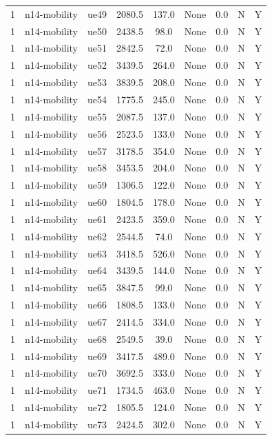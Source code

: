 \begin{table}[ht]
\begin{tabular}{|c|c|c|c|c|c|c|c|c|}
1 & n14-mobility & ue49 & 2080.5 & 137.0 & None & 0.0 & N & Y \\
1 & n14-mobility & ue50 & 2438.5 & 98.0 & None & 0.0 & N & Y \\
1 & n14-mobility & ue51 & 2842.5 & 72.0 & None & 0.0 & N & Y \\
1 & n14-mobility & ue52 & 3439.5 & 264.0 & None & 0.0 & N & Y \\
1 & n14-mobility & ue53 & 3839.5 & 208.0 & None & 0.0 & N & Y \\
1 & n14-mobility & ue54 & 1775.5 & 245.0 & None & 0.0 & N & Y \\
1 & n14-mobility & ue55 & 2087.5 & 137.0 & None & 0.0 & N & Y \\
1 & n14-mobility & ue56 & 2523.5 & 133.0 & None & 0.0 & N & Y \\
1 & n14-mobility & ue57 & 3178.5 & 354.0 & None & 0.0 & N & Y \\
1 & n14-mobility & ue58 & 3453.5 & 204.0 & None & 0.0 & N & Y \\
1 & n14-mobility & ue59 & 1306.5 & 122.0 & None & 0.0 & N & Y \\
1 & n14-mobility & ue60 & 1804.5 & 178.0 & None & 0.0 & N & Y \\
1 & n14-mobility & ue61 & 2423.5 & 359.0 & None & 0.0 & N & Y \\
1 & n14-mobility & ue62 & 2544.5 & 74.0 & None & 0.0 & N & Y \\
1 & n14-mobility & ue63 & 3418.5 & 526.0 & None & 0.0 & N & Y \\
1 & n14-mobility & ue64 & 3439.5 & 144.0 & None & 0.0 & N & Y \\
1 & n14-mobility & ue65 & 3847.5 & 99.0 & None & 0.0 & N & Y \\
1 & n14-mobility & ue66 & 1808.5 & 133.0 & None & 0.0 & N & Y \\
1 & n14-mobility & ue67 & 2414.5 & 334.0 & None & 0.0 & N & Y \\
1 & n14-mobility & ue68 & 2549.5 & 39.0 & None & 0.0 & N & Y \\
1 & n14-mobility & ue69 & 3417.5 & 489.0 & None & 0.0 & N & Y \\
1 & n14-mobility & ue70 & 3692.5 & 333.0 & None & 0.0 & N & Y \\
1 & n14-mobility & ue71 & 1734.5 & 463.0 & None & 0.0 & N & Y \\
1 & n14-mobility & ue72 & 1805.5 & 124.0 & None & 0.0 & N & Y \\
1 & n14-mobility & ue73 & 2424.5 & 302.0 & None & 0.0 & N & Y \\

\end{tabular}
\end{table}
